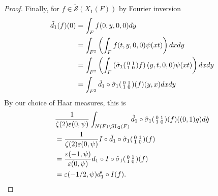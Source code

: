 \documentclass[11pt,a4paper,reqno]{amsart}
\newtheorem{cor}[thm]{Corollary}
\theoremstyle{remark}
\numberwithin{equation}{section}
\newcommand{\SL}{\mathrm{SL}}
\theoremstyle{definition}
\numberwithin{equation}{section}
\newenvironment{psmatrix}
  {\left(\begin{smallmatrix}}
  {\end{smallmatrix}\right)}
\begin{document}
\begin{proof}
Finally, for $f\in \widetilde{\mathcal{S}}(X_1(F))$ by Fourier inversion
\begin{align*}
    \tilde{d}_1(f)(0)&=\int_{F} f(0,y,0,0)dy\\
    &=\int_{F^2}\left(\int_{F} f(t,y,0,0)\psi(xt)\right)dxdy\\
    &=\int_{F^2}\left(\int_{F} \left(\tilde{\sigma}_1\begin{psmatrix}
        0 & 1\\
         1 & 0
    \end{psmatrix}f\right)(y,t,0,0)\psi(xt)\right)dxdy\\
    &=\int_{F^2}\tilde{d}_1\circ \tilde{\sigma}_1\begin{psmatrix}
        0 & 1\\
         1 & 0
    \end{psmatrix}(f)(y,x)dxdy
\end{align*}
By our choice of Haar measures, this is
\begin{align*}
    &\frac{1}{\zeta(2)\varepsilon(0,\psi)}\int_{N(F)\backslash \SL_2(F)}\tilde{d}_1\circ \tilde{\sigma}_1\begin{psmatrix}
        0 & 1\\
         1 & 0
    \end{psmatrix}(f)((0,1)g)d\dot{g}\\
    &=\frac{1}{\zeta(2)\varepsilon(0,\psi)}I\circ\tilde{d}_1\circ \tilde{\sigma}_1\begin{psmatrix}
        0 & 1\\
         1 & 0
    \end{psmatrix}(f)\\
    &=\frac{\varepsilon(-1,\psi)}{\varepsilon(0,\psi)}d_{1}\circ I\circ \tilde{\sigma}_1\begin{psmatrix}
        0 & 1\\
         1 & 0
    \end{psmatrix}(f)\\
    &=\varepsilon(-1/2,\psi)d_{1}'\circ I(f).
\end{align*}


\end{proof}

\end{document}
